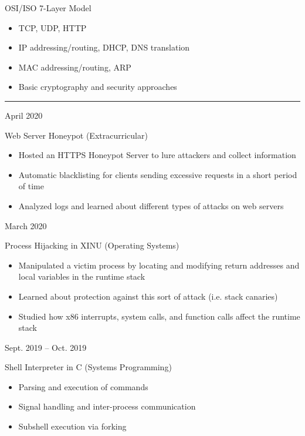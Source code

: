 \documentclass[a4paper]{article}
\newlength{\cvcolumngapwidth}
\newlength{\cvleftcolumnwidth}
\newlength{\cvrightcolumnwidth}
\newcommand{\cvsectionstyle}[1]{{\normalsize\cvsectionfont\textcolor{cvsectioncolor}{#1}}}
\newcommand{\cvtitlestyle}[1]{{\large\cvtitlefont\textcolor{cvtitlecolor}{#1}}}
\newcommand{\cvdurationstyle}[1]{{\small\cvdurationfont\textcolor{cvdurationcolor}{#1}}}
\newcommand{\cvheadingstyle}[1]{{\normalsize\cvheadingfont\textcolor{cvheadingcolor}{#1}}}
\newlength{\cvafteritemskipamount}
\newlength{\cvaftersectionskipamount}
\newlength{\cvaftertitleskipamount}
\newlength{\cvparskip}
\newcommand{\cvsection}[1]{
    \begin{minipage}[t]{\cvleftcolumnwidth}
        \raggedleft\cvsectionstyle{#1}
    \end{minipage}%
    \hspace{\cvcolumngapwidth}%
    \begin{minipage}[t]{\cvrightcolumnwidth}
        \textcolor{cvrulecolor}{\rule{\cvrightcolumnwidth}{0.3mm}}
    \end{minipage}

    \vspace{\cvaftersectionskipamount}
}
\newcommand{\cvitem}[2]{
    \begin{minipage}[t]{\cvleftcolumnwidth}
        \raggedleft #1
    \end{minipage}%
    \hspace{\cvcolumngapwidth}%
    \begin{minipage}[t]{\cvrightcolumnwidth}
        \setlength{\parskip}{\cvparskip} #2
    \end{minipage}

    \vspace{\cvafteritemskipamount}
}
\newcommand{\cvtitle}[1]{
    \cvtitlestyle{#1}

    \vspace{\cvaftertitleskipamount}
    \vspace{-\cvparskip}
}
\begin{document}
\cvitem{
    \cvheadingstyle{OSI/ISO 7-Layer Model}
}{
    \begin{itemize}[leftmargin=*]
      \item TCP, UDP, HTTP
      \item IP addressing/routing, DHCP, DNS translation
      \item MAC addressing/routing, ARP
      \item Basic cryptography and security approaches
    \end{itemize}
}


\cvsection{\LARGE \textcolor{emphasiscolor}{PROJECTS}}

\cvitem{
    \cvdurationstyle{April 2020}
}{
  \cvtitle{Web Server Honeypot (Extracurricular)}

    \begin{itemize}[leftmargin=*]
        \item Hosted an HTTPS Honeypot Server to lure attackers and collect information
        \item Automatic blacklisting for clients sending excessive requests in a short period of time
        \item Analyzed logs and learned about different types of attacks on web servers
    \end{itemize}
    \vspace{2mm}
}

% 
\cvitem{
    \cvdurationstyle{March 2020}
}{
  \cvtitle{Process Hijacking in XINU (Operating Systems)}

    \begin{itemize}[leftmargin=*]
        \item Manipulated a victim process by locating and modifying return addresses and local variables in the runtime stack
        \item Learned about protection against this sort of attack (i.e. stack canaries)
        \item Studied how x86 interrupts, system calls, and function calls affect the runtime stack
    \end{itemize}
    \vspace{2mm}
}

\cvitem{
    \cvdurationstyle{Sept. 2019 -- Oct. 2019}
}{
  \cvtitle{Shell Interpreter in C (Systems Programming)}

    \begin{itemize}[leftmargin=*]
        \item Parsing and execution of commands
        \item Signal handling and inter-process communication
        \item Subshell execution via forking
    \end{itemize}
}
\end{document}

